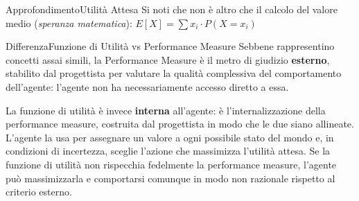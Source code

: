 \documentclass[a4paper, 11pt, oneside]{book}
\theoremstyle{definition}
\begin{document}
	\begin{nota}
		{Approfondimento}{Utilit\`a Attesa} Si noti che non \`e altro che il calcolo
		del valore medio (\emph{speranza matematica}): $E[X] = \sum x_{i} \cdot P(X =
		x_{i})$
	\end{nota}

	\begin{nota}
		{Differenza}{Funzione di Utilit\`a vs Performance Measure} Sebbene
		rappresentino concetti assai simili, la Performance Measure \`e il metro di
		giudizio \textbf{esterno}, stabilito dal progettista per valutare la qualit\`a
		complessiva del comportamento dell'agente: l'agente non ha necessariamente accesso
		diretto a essa.

		La funzione di utilit\`a \`e invece \textbf{interna} all'agente: \`e
		l'internalizzazione della performance measure, costruita dal progettista in
		modo che le due siano allineate. L'agente la usa per assegnare un
		valore a ogni possibile stato del mondo e, in condizioni di incertezza,
		sceglie l'azione che massimizza l'utilit\`a
		attesa. Se la funzione di utilit\`a non rispecchia fedelmente la performance
		measure, l'agente pu\`o massimizzarla e comportarsi comunque in modo non razionale
		rispetto al criterio esterno.
	\end{nota}
\end{document}
